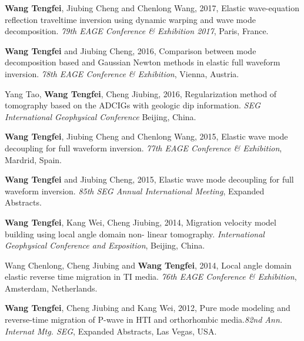 \begin{resume}
  \begin{enumerate}[{[}1{]}]
	  \item {\bf{Wang Tengfei}}, Jiubing Cheng and Chenlong Wang, 2017, Elastic wave-equation reflection
		  traveltime inversion using dynamic warping and wave mode decomposition. \emph{79th EAGE
		  Conference \& Exhibition 2017}, Paris, France.
	  \item {\bf{Wang Tengfei}} and Jiubing Cheng, 2016, Comparison between mode decomposition based and
		  Gaussian Newton methods in elastic full waveform inversion. \emph{ 78th EAGE Conference \&
		  Exhibition}, Vienna, Austria.
	  \item Yang Tao, {\bf{Wang Tengfei}}, Cheng Jiubing, 2016, Regularization method of tomography based on the ADCIGs
		  with geologic dip information. \emph{SEG International Geophysical
		  Conference} Beijing, China.
	  \item {\bf{Wang Tengfei}}, Jiubing Cheng and Chenlong Wang, 2015, Elastic wave mode decoupling for
		  full waveform inversion. \emph{77th EAGE Conference \& Exhibition}, Mardrid, Spain.
	  \item {\bf{Wang Tengfei}} and Jiubing Cheng, 2015, Elastic wave mode decoupling for full waveform
		  inversion. \emph{85th SEG Annual International Meeting}, Expanded Abstracts.
	  \item   {\bf{Wang Tengfei}}, Kang Wei, Cheng Jiubing, 2014, Migration velocity model building using local angle domain non-
		  linear tomography. \emph{International Geophysical Conference and Exposition}, 
		  Beijing, China. 
	  \item Wang Chenlong, Cheng Jiubing and {\bf{Wang Tengfei}}, 2014, Local angle domain elastic reverse
		  time migration in TI media. \emph{76th EAGE Conference \& Exhibition}, Amsterdam,
		  Netherlands. 
	  \item {\bf{Wang Tengfei}}, Cheng Jiubing and Kang Wei, 2012, Pure mode modeling and reverse-time
		  migration of P-wave in HTI and orthorhombic media.\emph{82nd Ann.
		  Internat Mtg. SEG}, Expanded Abstracts, Las Vegas, USA.
			  
  \end{enumerate}
\end{resume}
